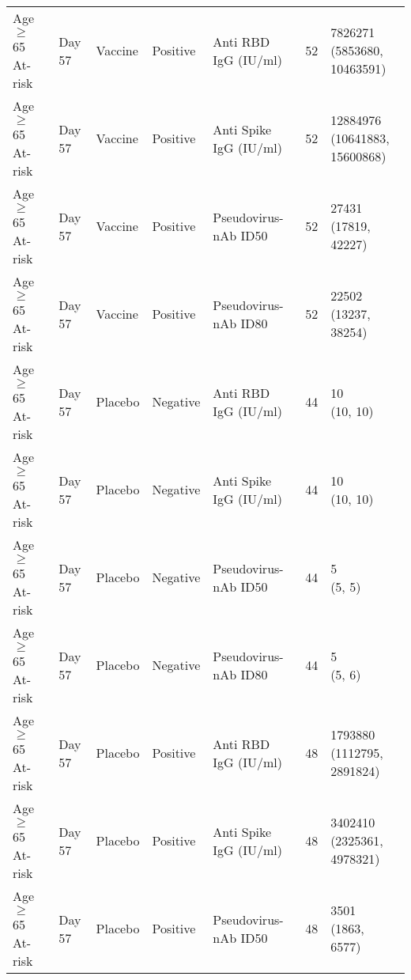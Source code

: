 \documentclass[]{book}
\theoremstyle{definition}
\theoremstyle{definition}
\theoremstyle{definition}
\newcommand{\1}{\mathbbm{1}}
\begin{document}
\begin{landscape}
\begin{ThreePartTable}
\begin{longtable}[t]{>{\raggedright\arraybackslash}p{7cm}llllll}
\hspace{1em}Age $\geq$ 65 At-risk & Day 57 & Vaccine & Positive & Anti RBD IgG (IU/ml) & 52 & \makecell[l]{7826271\\(5853680, 10463591)}\\
\hspace{1em}Age $\geq$ 65 At-risk & Day 57 & Vaccine & Positive & Anti Spike IgG (IU/ml) & 52 & \makecell[l]{12884976\\(10641883, 15600868)}\\
\hspace{1em}Age $\geq$ 65 At-risk & Day 57 & Vaccine & Positive & Pseudovirus-nAb ID50 & 52 & \makecell[l]{27431\\(17819, 42227)}\\
\hspace{1em}Age $\geq$ 65 At-risk & Day 57 & Vaccine & Positive & Pseudovirus-nAb ID80 & 52 & \makecell[l]{22502\\(13237, 38254)}\\
\hspace{1em}Age $\geq$ 65 At-risk & Day 57 & Placebo & Negative & Anti RBD IgG (IU/ml) & 44 & \makecell[l]{10\\(10, 10)}\\
\hspace{1em}Age $\geq$ 65 At-risk & Day 57 & Placebo & Negative & Anti Spike IgG (IU/ml) & 44 & \makecell[l]{10\\(10, 10)}\\
\hspace{1em}Age $\geq$ 65 At-risk & Day 57 & Placebo & Negative & Pseudovirus-nAb ID50 & 44 & \makecell[l]{5\\(5, 5)}\\
\hspace{1em}Age $\geq$ 65 At-risk & Day 57 & Placebo & Negative & Pseudovirus-nAb ID80 & 44 & \makecell[l]{5\\(5, 6)}\\
\hspace{1em}Age $\geq$ 65 At-risk & Day 57 & Placebo & Positive & Anti RBD IgG (IU/ml) & 48 & \makecell[l]{1793880\\(1112795, 2891824)}\\
\hspace{1em}Age $\geq$ 65 At-risk & Day 57 & Placebo & Positive & Anti Spike IgG (IU/ml) & 48 & \makecell[l]{3402410\\(2325361, 4978321)}\\
\hspace{1em}Age $\geq$ 65 At-risk & Day 57 & Placebo & Positive & Pseudovirus-nAb ID50 & 48 & \makecell[l]{3501\\(1863, 6577)}\\

\end{longtable}
\end{ThreePartTable}
\end{landscape}
\end{document}
